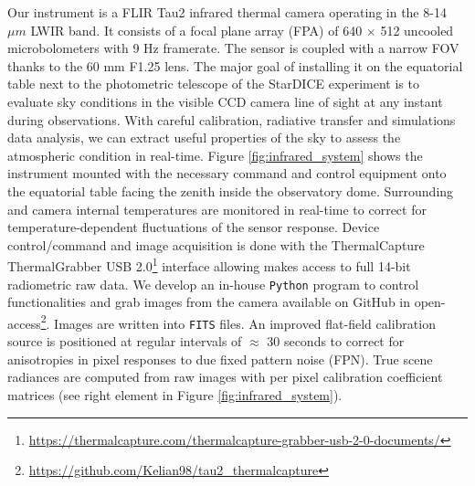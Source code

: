 \documentclass[amt, article]{copernicus}
\begin{document}
Our instrument is a FLIR Tau2 infrared thermal camera operating in the 8-14 $\mu m$ LWIR band. It consists of a focal plane array (FPA) of 640 $\times$ 512 uncooled microbolometers with 9 Hz framerate. The sensor is coupled with a narrow FOV thanks to the 60 mm F1.25 lens. The major goal of installing it on the equatorial table next to the photometric telescope of the StarDICE experiment is to evaluate sky conditions in the visible CCD camera line of sight at any instant during observations. With careful calibration, radiative transfer and simulations data analysis, we can extract useful properties of the sky to assess the atmospheric condition in real-time. Figure \ref{fig:infrared_system} shows the instrument mounted with the necessary command and control equipment onto the equatorial table facing the zenith inside the observatory dome. Surrounding and camera internal temperatures are monitored in real-time to correct for temperature-dependent fluctuations of the sensor response. Device control/command and image acquisition is done with the ThermalCapture ThermalGrabber USB 2.0\footnote{\url{https://thermalcapture.com/thermalcapture-grabber-usb-2-0-documents/}} interface allowing makes access to full 14-bit radiometric raw data. We develop an in-house \texttt{Python} program to control functionalities and grab images from the camera available on GitHub in open-access\footnote{\url{https://github.com/Kelian98/tau2_thermalcapture}}. Images are written into \texttt{FITS} files. An improved flat-field calibration source is positioned at regular intervals of $\approx$ 30 seconds to correct for anisotropies in pixel responses to due fixed pattern noise (FPN). True scene radiances are computed from raw images with per pixel calibration coefficient matrices (see right element in Figure \ref{fig:infrared_system}).
\end{document}
